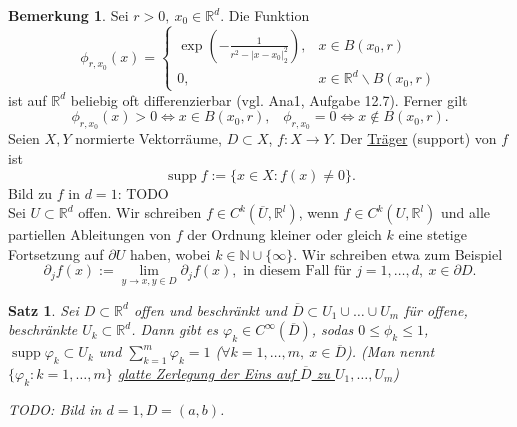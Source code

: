 \documentclass[a4paper]{scrreprt}
\newcommand{\R}{\mathbb{R}}
\newcommand{\N}{\mathbb{N}}
\newcommand{\jlabel}[1]{\label{j_#1}}
\newcommand{\jterm}[1]{\jlabel{#1}\uline{#1}}
\newcommand{\jabb}[3]{ #1: #2 \rightarrow #3 }
\newcommand{\jspace}{\vspace{8pt}}
\newcommand{\supp}{\mathop{\mathrm{{supp}}}}
\theoremstyle{plain}
\newtheorem{satz}[thm]{Satz}
\theoremstyle{definition}
\newtheorem{bem}[thm]{Bemerkung}
\begin{document}
{{{{\begin{bem}
    \jlabel{Bem 4.16}
    Sei $r>0, \ x_0 \in \R^d$. Die Funktion
    \[
        \phi_{r,x_0} (x) = \begin{cases}
                               \exp\left(-\frac{1}{r^2 - |x-x_0|_2^2} \right), &x\in B(x_0,r)\\
                               0, & x\in \R^d\backslash B(x_0,r)
                           \end{cases}
    \]
    ist auf $\R^d$ beliebig oft differenzierbar (vgl. Ana1, Aufgabe 12.7). Ferner gilt
    \[
        \phi_{r,x_0}(x) > 0 \Leftrightarrow x\in B(x_0,r), \hspace{10pt} \phi_{r,x_0} =0 \Leftrightarrow x\notin B(x_0,r).
    \]
    Seien $X,Y$ normierte Vektorräume, $D\subset X$, $\jabb{f}{X}{Y}$. Der \jterm{Träger} (support) von $f$ ist
    \[
        \supp f := \{x\in X : f(x) \ne 0\}.
    \]
    Bild zu $f$ in $d=1$: TODO\\
    Sei $U\subset \R^d$ offen. Wir schreiben $f\in C^k(\overline{U}, \R^l)$, wenn $f\in C^k(U, \R^l)$ und alle partiellen Ableitungen von $f$ der Ordnung kleiner oder gleich $k$ eine stetige Fortsetzung auf $\partial U$ haben, wobei $k\in\N \cup \{\infty\}$. Wir schreiben etwa zum Beispiel
    \[
        \partial_j f(x) := \lim_{y\rightarrow x, y\in D} \partial_j f(x), \text{ in diesem Fall für } j=1,\dots,d,\ x\in \partial D.
    \]
\end{bem}

\begin{satz}
    \jlabel{Satz 4.17}
    Sei $D\subset \R^d$ offen und beschränkt und $\overline{D}\subset U_1\cup\dots\cup U_m$ für offene, beschränkte $U_k\subset \R^d$. Dann gibt es $\varphi_k \in C^\infty(\overline{D})$, sodas $0\le \phi_k \le 1$, $\supp \varphi_k \subset U_k$ und $\sum_{k=1}^m \varphi_k = 1$ ($\forall k=1,\dots,m, \ x\in \overline{D}$). (Man nennt $\{\varphi_k : k=1,\dots,m\}$ \uline{glatte Zerlegung der Eins auf $\overline{D}$ zu $U_1,\dots,U_m$})
    
    \jspace
    
    TODO: Bild in $d=1, D=(a,b)$.
     

\end{satz}}}}}
\end{document}
